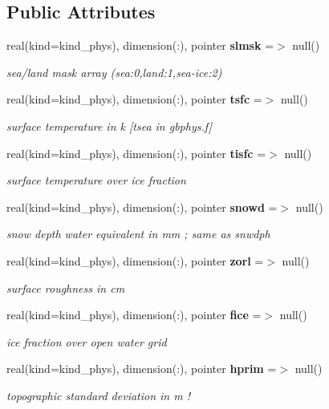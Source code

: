 \subsection*{Public Attributes}
\begin{DoxyCompactItemize}
\item 
real(kind=kind\+\_\+phys), dimension(\+:), pointer \textbf{ slmsk} =$>$ null()
\begin{DoxyCompactList}\small\item\em sea/land mask array (sea\+:0,land\+:1,sea-\/ice\+:2) \end{DoxyCompactList}\item 
real(kind=kind\+\_\+phys), dimension(\+:), pointer \textbf{ tsfc} =$>$ null()
\begin{DoxyCompactList}\small\item\em surface temperature in k [tsea in gbphys.\+f] \end{DoxyCompactList}\item 
real(kind=kind\+\_\+phys), dimension(\+:), pointer \textbf{ tisfc} =$>$ null()
\begin{DoxyCompactList}\small\item\em surface temperature over ice fraction \end{DoxyCompactList}\item 
real(kind=kind\+\_\+phys), dimension(\+:), pointer \textbf{ snowd} =$>$ null()
\begin{DoxyCompactList}\small\item\em snow depth water equivalent in mm ; same as snwdph \end{DoxyCompactList}\item 
real(kind=kind\+\_\+phys), dimension(\+:), pointer \textbf{ zorl} =$>$ null()
\begin{DoxyCompactList}\small\item\em surface roughness in cm \end{DoxyCompactList}\item 
real(kind=kind\+\_\+phys), dimension(\+:), pointer \textbf{ fice} =$>$ null()
\begin{DoxyCompactList}\small\item\em ice fraction over open water grid \end{DoxyCompactList}\item 
real(kind=kind\+\_\+phys), dimension(\+:), pointer \textbf{ hprim} =$>$ null()
\begin{DoxyCompactList}\small\item\em topographic standard deviation in m ! \end{DoxyCompactList}\item 

\end{DoxyCompactItemize}
